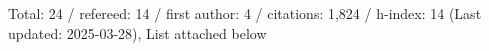 Total: 24 / refereed: 14 / first author: 4 / citations: 1,824 / h-index: 14 (Last updated: 2025-03-28), List attached below